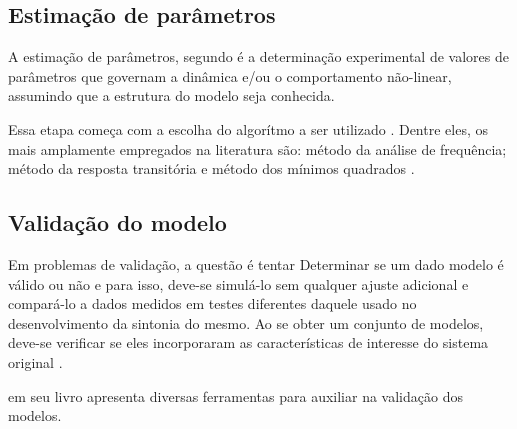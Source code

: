 \subsection{Estimação de parâmetros}
\label{subsec:estimacao_de_parametros}

A estimação de parâmetros, segundo  é a determinação experimental
de valores de parâmetros que governam a dinâmica e/ou o comportamento não-linear, assumindo que a
estrutura do modelo seja conhecida.

Essa etapa começa com a escolha do algorítmo a ser utilizado \cite{Aguirre2015}. Dentre eles, os
mais amplamente empregados na literatura são: método da análise de frequência; método da resposta
transitória e método dos mínimos quadrados \cite{Favaro2012}.

\subsection{Validação do modelo}
\label{subsec:validacao_do_modelo}

Em problemas de validação, a questão é tentar Determinar se um dado modelo é válido ou não e para isso,
deve-se simulá-lo sem qualquer ajuste adicional e compará-lo a dados medidos em testes diferentes daquele
usado no desenvolvimento da sintonia do mesmo. Ao se obter um conjunto de modelos, deve-se verificar se
eles incorporaram as características de interesse do sistema original \cite{Aguirre2015}.

 em seu livro apresenta diversas ferramentas para auxiliar na validação dos modelos.

